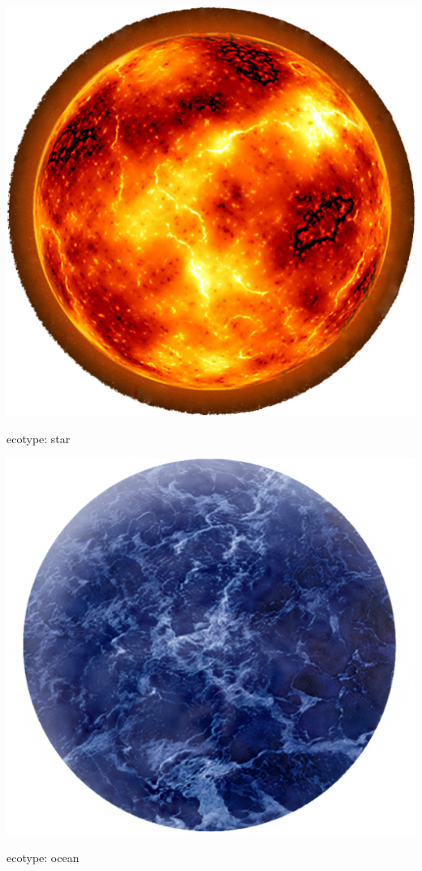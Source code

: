 \begin{marginfigure}
	\includegraphics{res/planets/star.png}
	\caption{ecotype: star}
	\label{fig:model:starPlanet}
\end{marginfigure}

\begin{marginfigure}
	\includegraphics{res/planets/OceanPlanet.png}
	\caption{ecotype: ocean}
	\label{fig:model:oceanPlanet}
\end{marginfigure}

